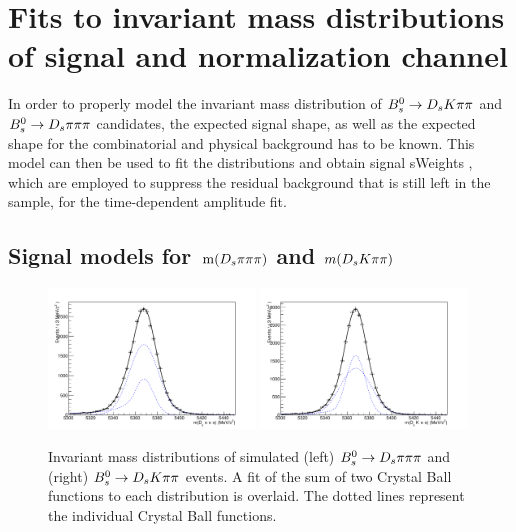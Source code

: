 \section{Fits to invariant mass distributions of signal and normalization channel}
\label{sec: massfits}

In order to properly model the invariant mass distribution of ${{B}^0_{s}}\rightarrow{\ensuremath{{D}_{s}}}{\ensuremath{K}}{\ensuremath{\pi}}{\ensuremath{\pi}}$ and ${{B}^0_{s}}\rightarrow{\ensuremath{{D}_{s}}}{\ensuremath{\pi}}{\ensuremath{\pi}}{\ensuremath{\pi}}$ candidates, 
the expected signal shape, as well as the expected shape for the combinatorial and physical background has to be known. 
This model can then be used to fit the distributions and obtain signal sWeights \cite{Pivk:2004ty}, 
which are employed to suppress the residual background that is still left in the sample, for the time-dependent amplitude fit.   

\subsection{Signal models for $\mathrm{ \,m}({{D}_{s}}{\pi}{\pi}{\pi})$ and $m({{D}_{s}}{K}{\pi}{\pi})$}
\label{subsec: signalmodel}

\begin{figure}[h]
\includegraphics[height=7.cm,width=0.49\textwidth]{figs/Bs2Dspipipi_MC_SignalShape.pdf}
\includegraphics[height=7.cm,width=0.49\textwidth]{figs/Bs2DsKpipi_MC_SignalShape.pdf}
\caption{Invariant mass distributions of simulated (left) ${{B}^0_{s}}\rightarrow{\ensuremath{{D}_{s}}}{\ensuremath{\pi}}{\ensuremath{\pi}}{\ensuremath{\pi}}$ and (right) ${{B}^0_{s}}\rightarrow{\ensuremath{{D}_{s}}}{\ensuremath{K}}{\ensuremath{\pi}}{\ensuremath{\pi}}$ events. A fit of the sum of two Crystal Ball functions to each distribution is overlaid. The dotted lines represent the individual Crystal Ball functions.}
\label{fig: BsMassShapes}
\end{figure}


